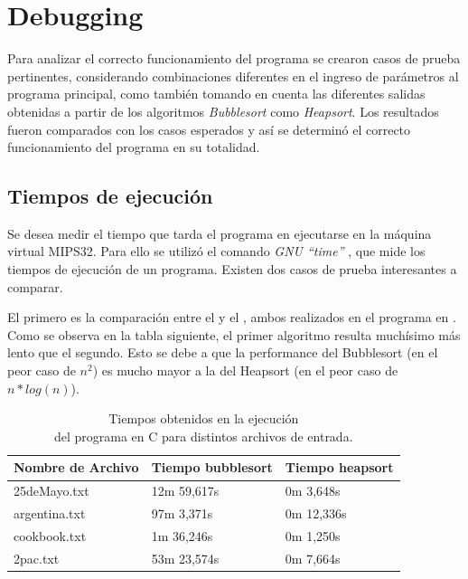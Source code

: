 \documentclass{article}
\begin{document}
\section{Debugging}
	
	Para analizar el correcto funcionamiento del programa se crearon casos de prueba pertinentes, considerando combinaciones diferentes en el ingreso de parámetros al programa principal, como también tomando en cuenta las diferentes salidas obtenidas a partir de los algoritmos \textit{Bubblesort} como \textit{Heapsort}. Los resultados fueron comparados con los casos esperados y así se determinó el correcto funcionamiento del programa en su totalidad.
\bigskip\bigskip


\newpage


\subsection{Tiempos de ejecución}

	\par
	Se desea medir el tiempo que tarda el programa en ejecutarse en la máquina virtual MIPS32. Para ello se utilizó el comando \textit{GNU ``time''} \cite{TIME}, que mide los tiempos de ejecución de un programa. Existen dos casos de prueba interesantes a comparar. 
	
	El primero es la comparación entre el  y el , ambos realizados en el programa en . Como se observa en la tabla siguiente, el primer algoritmo resulta muchísimo más lento que el segundo. Esto se debe a que la performance del Bubblesort (en el peor caso de \(n^2\)) es mucho mayor a la del Heapsort (en el peor caso de \(n*log(n)\)).
	\medskip

	\begin{table}[!hbt]
		\begin{center}
		\begin{tabular}{|>{\centering\arraybackslash}m{3cm}|>{\centering \arraybackslash}m{3cm}|}
			\hline
			\textbf{Nombre de Archivo} & \textbf{Tiempo bubblesort} & \textbf{Tiempo heapsort}\\
			\hline
			\centering 25deMayo.txt & 12m 59,617s & 0m 3,648s \\
			\hline
			\centering argentina.txt & 97m 3,371s & 0m 12,336s \\
			\hline
			\centering cookbook.txt & 1m 36,246s & 0m 1,250s \\
			\hline
			\centering 2pac.txt & 53m 23,574s & 0m 7,664s \\
			\hline
		\end{tabular}
		\smallskip
		\caption{Tiempos obtenidos en la ejecución\\ del programa en C para distintos archivos de entrada.}
		\end{center}
	\end{table}
\end{document}
